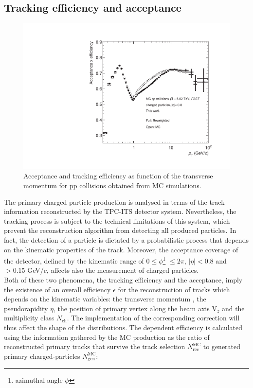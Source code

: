 \documentclass[12pt,a4paper]{report}
\begin{document}
\subsection{Tracking efficiency and acceptance}
\begin{figure}[tb!]
\centering
\includegraphics[width=12cm]{Plots/trckEffpp.pdf}  
\caption{Acceptance and tracking efficiency as function of the transverse momentum for pp collisions obtained from MC simulations.}
\label{trckEffpp}
\end{figure}
The primary charged-particle production is analysed in terms of the track information reconstructed by the TPC-ITS detector system. Nevertheless, the tracking process is subject to the technical limitations of this system, which prevent the reconstruction algorithm from detecting all produced particles. In fact, the detection of a particle is dictated by a probabilistic process that depends on the kinematic properties of the track. Moreover, the acceptance coverage of the detector, defined by the kinematic range of $0 \leq \phi$\footnote{azimuthal angle $\phi$} $\leq 2\pi$, $|\eta| < 0.8$ and \pt $> 0.15$ GeV/$c$, affects also the measurement of charged particles. \\
Both of these two phenomena, the tracking efficiency and the acceptance, imply the existence of an overall efficiency $\epsilon$ for the reconstruction of tracks which depends on the kinematic variables: the transverse momentum \pt, the pseudorapidity $\eta$, the position of primary vertex along the beam axis $\text{V}_z$ and the multiplicity class $N_\text{ch}$. The implementation of the corresponding correction will thus affect the shape of the \pt distributions. The \pt dependent efficiency is calculated using the information gathered by the MC production as the ratio of reconstructed primary tracks that survive the track selection $N_\text{rec}^\text{MC}$ to generated primary charged-particles $N_\text{gen}^\text{MC}$: 
\end{document}
